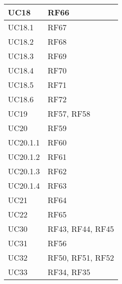 \begin{center}
\begin{longtable}{|C{5cm}|C{5cm}|}
        \hline
        UC18 & RF66 \\
        \hline
        UC18.1 & RF67 \\
        \hline
        UC18.2 & RF68 \\
        \hline
        UC18.3 & RF69 \\
        \hline
        UC18.4 & RF70 \\
        \hline
        UC18.5 & RF71 \\
        \hline
        UC18.6 & RF72 \\
        \hline
        UC19 & RF57, RF58 \\
        \hline
        UC20 & RF59 \\
        \hline
        UC20.1.1 & RF60 \\
        \hline
        UC20.1.2 & RF61 \\
        \hline
        UC20.1.3 & RF62 \\
        \hline
        UC20.1.4 & RF63 \\
        \hline
        UC21 & RF64 \\
        \hline
        UC22 & RF65 \\
        \hline
        UC30 & RF43, RF44, RF45 \\
        \hline
        UC31 & RF56 \\
        \hline
        UC32 & RF50, RF51, RF52 \\
        \hline
        UC33 & RF34, RF35 \\
        \hline
    \end{longtable}
\end{center}
